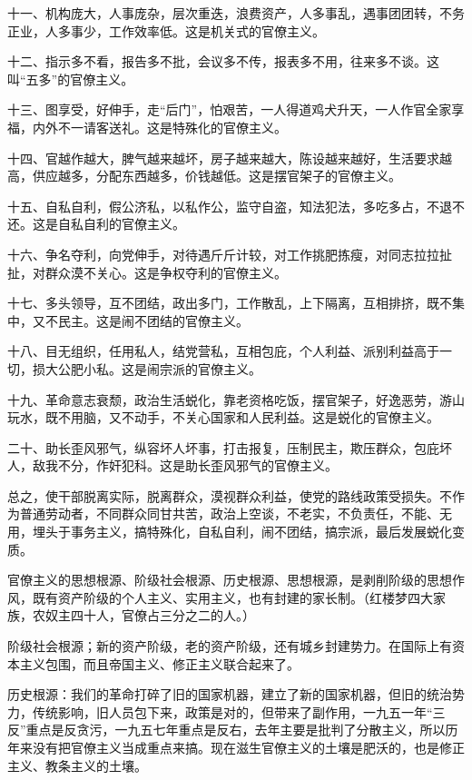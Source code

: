 十一、机构庞大，人事庞杂，层次重迭，浪费资产，人多事乱，遇事团团转，不务正业，人多事少，工作效率低。这是机关式的官僚主义。

十二、指示多不看，报告多不批，会议多不传，报表多不用，往来多不谈。这叫“五多”的官僚主义。

十三、图享受，好伸手，走“后门”，怕艰苦，一人得道鸡犬升天，一人作官全家享福，内外不一请客送礼。这是特殊化的官僚主义。

十四、官越作越大，脾气越来越坏，房子越来越大，陈设越来越好，生活要求越高，供应越多，分配东西越多，价钱越低。这是摆官架子的官僚主义。

十五、自私自利，假公济私，以私作公，监守自盗，知法犯法，多吃多占，不退不还。这是自私自利的官僚主义。

十六、争名夺利，向党伸手，对待遇斤斤计较，对工作挑肥拣瘦，对同志拉拉扯扯，对群众漠不关心。这是争权夺利的官僚主义。

十七、多头领导，互不团结，政出多门，工作散乱，上下隔离，互相排挤，既不集中，又不民主。这是闹不团结的官僚主义。

十八、目无组织，任用私人，结党营私，互相包庇，个人利益、派别利益高于一切，损大公肥小私。这是闹宗派的官僚主义。

十九、革命意志衰颓，政治生活蜕化，靠老资格吃饭，摆官架子，好逸恶劳，游山玩水，既不用脑，又不动手，不关心国家和人民利益。这是蜕化的官僚主义。

二十、助长歪风邪气，纵容坏人坏事，打击报复，压制民主，欺压群众，包庇坏人，敌我不分，作奸犯科。这是助长歪风邪气的官僚主义。

总之，使干部脱离实际，脱离群众，漠视群众利益，使党的路线政策受损失。不作为普通劳动者，不同群众同甘共苦，政治上空谈，不老实，不负责任，不能、无用，埋头于事务主义，搞特殊化，自私自利，闹不团结，搞宗派，最后发展蜕化变质。

官僚主义的思想根源、阶级社会根源、历史根源、思想根源，是剥削阶级的思想作风，既有资产阶级的个人主义、实用主义，也有封建的家长制。（红楼梦四大家族，农奴主四十人，官僚占三分之二的人。）

阶级社会根源；新的资产阶级，老的资产阶级，还有城乡封建势力。在国际上有资本主义包围，而且帝国主义、修正主义联合起来了。

历史根源：我们的革命打碎了旧的国家机器，建立了新的国家机器，但旧的统治势力，传统影响，旧人员包下来，政策是对的，但带来了副作用，一九五一年“三反”重点是反贪污，一九五七年重点是反右，去年主要是批判了分散主义，所以历年来没有把官僚主义当成重点来搞。现在滋生官僚主义的土壤是肥沃的，也是修正主义、教条主义的土壤。

